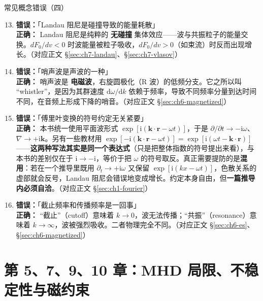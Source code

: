 \documentclass[12pt,a4paper,openany,oneside]{book}
\newcommand{\diff}{\mathrm{d}}
\newcommand{\ii}{\mathrm{i}}
\newcommand{\vect}[1]{\bm{#1}}
\newcommand{\grad}{\nabla}
\begin{document}
\begin{warning}{常见概念错误（四）}{}
\begin{enumerate}
\setcounter{enumi}{12}
\item \textbf{错误：}「Landau 阻尼是碰撞导致的能量耗散」\\
\textbf{正确：} Landau 阻尼是纯粹的 \textbf{无碰撞} 集体效应——波与共振粒子的能量交换。$dF_0/dv<0$ 时波能量被粒子吸收，$dF_0/dv>0$（如束流）时反而出现增长。（对应正文 \S\ref{sec:ch7-landau}、\S\ref{sec:ch7-vlasov}）

\item \textbf{错误：}「哨声波是声波的一种」\\
\textbf{正确：} 哨声波是 \textbf{电磁波}，右旋圆极化（R 波）的低频分支。它之所以叫 ``whistler''，是因为其群速度 $\diff\omega/\diff k$ 依赖于频率，导致不同频率分量到达时间不同，在音频上形成下降的哨音。（对应正文 \S\ref{sec:ch6-magnetized}）

\item \textbf{错误：}「傅里叶变换的符号约定无关紧要」\\
\textbf{正确：} 本书统一使用平面波形式 $\exp[\ii(\vect{k}\cdot\vect{r}-\omega t)]$，于是 $\partial/\partial t\to-\ii\omega$、$\grad\to+\ii\vect{k}$。另有一些教材用 $\exp[-\ii(\vect{k}\cdot\vect{r}-\omega t)] = \exp[\ii(\omega t-\vect{k}\cdot\vect{r})]$——\textbf{这两种写法其实是同一个表达式}（只是把整体指数的符号提出来看），与本书的差别仅在于 $\ii\to-\ii$，等价于把 $\omega$ 的符号取反。真正需要提防的是\textbf{混用}：若在一个推导里既用 $\partial_t\to+\ii\omega$ 又保留 $\exp[\ii(kx-\omega t)]$，色散关系的虚部就会反号，Landau 阻尼会错误地变成增长。约定本身自由，但\textbf{一篇推导内必须自洽}。（对应正文 \S\ref{sec:ch1-fourier}）

\item \textbf{错误：}「截止频率和传播频率是一回事」\\
\textbf{正确：} ``截止''（cutoff）意味着 $k\to 0$，波无法传播；``共振''（resonance）意味着 $k\to\infty$，波被强烈吸收。二者物理完全不同。（对应正文 \S\ref{sec:ch6-es}、\S\ref{sec:ch6-magnetized}）
\end{enumerate}
\end{warning}


\section{第 5、7、9、10 章：MHD 局限、不稳定性与磁约束}
\end{document}
